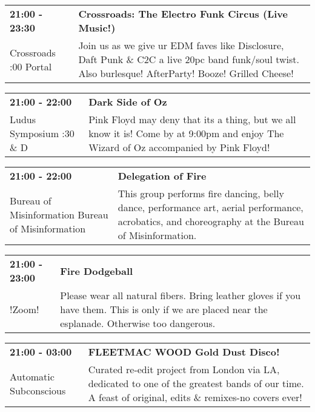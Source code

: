 \begin{tabular}{ p{1in} p{2.2in} }
    \textbf{21:00 - 23:30} & \textbf{Crossroads: The Electro Funk Circus (Live Music!)} \\
    Crossroads \newline 9:00 Portal & Join us as we give ur EDM faves like Disclosure, Daft Punk \& C2C a live 20pc band funk/soul twist.
Also burlesque! AfterParty! Booze! Grilled Cheese! \\
    \hline 
\end{tabular}
    
\begin{tabular}{ p{1in} p{2.2in} }
    \textbf{21:00 - 22:00} & \textbf{Dark Side of Oz} \\
    Ludus Symposium \newline 2:30 \& D & Pink Floyd may deny that its a thing, but we all know it is! Come by at 9:00pm and enjoy The Wizard of Oz accompanied by Pink Floyd! \\
    \hline 
\end{tabular}
    
\begin{tabular}{ p{1in} p{2.2in} }
    \textbf{21:00 - 22:00} & \textbf{Delegation of Fire} \\
    Bureau of Misinformation \newline Bureau of Misinformation & This group performs fire dancing, belly dance, performance art, aerial performance, acrobatics, and choreography at the Bureau of Misinformation. \\
    \hline 
\end{tabular}
    
\begin{tabular}{ p{1in} p{2.2in} }
    \textbf{21:00 - 23:00} & \textbf{Fire Dodgeball} \\
    !Zoom! \newline  & Please wear all natural fibers.  Bring leather gloves if you have them.  This is only if we are placed near the esplanade.  Otherwise too dangerous. \\
    \hline 
\end{tabular}
    
\begin{tabular}{ p{1in} p{2.2in} }
    \textbf{21:00 - 03:00} & \textbf{FLEETMAC WOOD Gold Dust Disco!} \\
    Automatic Subconscious \newline  & Curated re-edit project from London via LA, dedicated to one of the greatest bands of our time. A feast of original, edits \& remixes-no covers ever! \\
    \hline 
\end{tabular}
    
